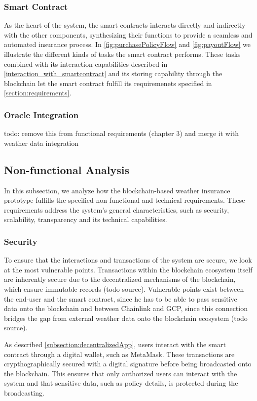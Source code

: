 \subsubsection{Smart Contract}
As the heart of the system, the smart contracts interacts directly and indirectly with the other components, synthesizing their functions to provide a seamless and automated insurance process. In \cref{fig:purchasePolicyFlow} and \cref{fig:payoutFlow} we illustrate the different kinds of tasks the smart contract performs. These tasks combined with its interaction capabilities described in \cref{interaction_with_smartcontract} and its storing capability through the blockchain let the smart contract fulfill its requiremenets specified in \cref{section:requirements}. 

\subsubsection{Oracle Integration}

todo: remove this from functional requirements (chapter 3) and merge it with weather data integration

\subsection{Non-functional Analysis}

In this subsection, we analyze how the blockchain-based weather insurance prototype fulfills the specified non-functional and technical requirements. These requirements address the system's general characteristics, such as security, scalability, transparency and its technical capabilities.

\subsubsection{Security}

To ensure that the interactions and transactions of the system are secure, we look at the most vulnerable points. Transactions within the blockchain ecosystem itself are inherently secure due to the decentralized mechanisms of the blockchain, which ensure immutable records (todo source). Vulnerable points exist between the end-user and the smart contract, since he has to be able to pass sensitive data onto the blockchain and between Chainlink and GCP, since this connection bridges the gap from external weather data onto the blockchain ecosystem (todo source). 

As described \cref{subsection:decentralizedApp}, users interact with the smart contract through a digital wallet, such as MetaMask. These transactions are crypthographically secured with a digital signature before being broadcasted onto the blockchain. This ensures that only authorized users can interact with the system and that sensitive data, such as policy details, is protected during the broadcasting. 

